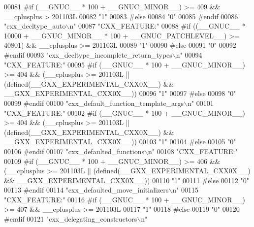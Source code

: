 \begin{DoxyCode}
00081 \textcolor{preprocessor}{#if (\_\_GNUC\_\_ * 100 + \_\_GNUC\_MINOR\_\_) >= 409 && \_\_cplusplus > 201103L}
00082 \textcolor{stringliteral}{"1"}
00083 \textcolor{preprocessor}{#else}
00084 \textcolor{stringliteral}{"0"}
00085 \textcolor{preprocessor}{#endif}
00086 \textcolor{stringliteral}{"cxx\_decltype\_auto\(\backslash\)n"}
00087 \textcolor{stringliteral}{"CXX\_FEATURE:"}
00088 \textcolor{preprocessor}{#if ((\_\_GNUC\_\_ * 10000 + \_\_GNUC\_MINOR\_\_ * 100 + \_\_GNUC\_PATCHLEVEL\_\_) >= 40801) && \_\_cplusplus >= 201103L}
00089 \textcolor{stringliteral}{"1"}
00090 \textcolor{preprocessor}{#else}
00091 \textcolor{stringliteral}{"0"}
00092 \textcolor{preprocessor}{#endif}
00093 \textcolor{stringliteral}{"cxx\_decltype\_incomplete\_return\_types\(\backslash\)n"}
00094 \textcolor{stringliteral}{"CXX\_FEATURE:"}
00095 \textcolor{preprocessor}{#if (\_\_GNUC\_\_ * 100 + \_\_GNUC\_MINOR\_\_) >= 404 && (\_\_cplusplus >= 201103L ||
       (defined(\_\_GXX\_EXPERIMENTAL\_CXX0X\_\_) && \_\_GXX\_EXPERIMENTAL\_CXX0X\_\_))}
00096 \textcolor{stringliteral}{"1"}
00097 \textcolor{preprocessor}{#else}
00098 \textcolor{stringliteral}{"0"}
00099 \textcolor{preprocessor}{#endif}
00100 \textcolor{stringliteral}{"cxx\_default\_function\_template\_args\(\backslash\)n"}
00101 \textcolor{stringliteral}{"CXX\_FEATURE:"}
00102 \textcolor{preprocessor}{#if (\_\_GNUC\_\_ * 100 + \_\_GNUC\_MINOR\_\_) >= 404 && (\_\_cplusplus >= 201103L ||
       (defined(\_\_GXX\_EXPERIMENTAL\_CXX0X\_\_) && \_\_GXX\_EXPERIMENTAL\_CXX0X\_\_))}
00103 \textcolor{stringliteral}{"1"}
00104 \textcolor{preprocessor}{#else}
00105 \textcolor{stringliteral}{"0"}
00106 \textcolor{preprocessor}{#endif}
00107 \textcolor{stringliteral}{"cxx\_defaulted\_functions\(\backslash\)n"}
00108 \textcolor{stringliteral}{"CXX\_FEATURE:"}
00109 \textcolor{preprocessor}{#if (\_\_GNUC\_\_ * 100 + \_\_GNUC\_MINOR\_\_) >= 406 && (\_\_cplusplus >= 201103L ||
       (defined(\_\_GXX\_EXPERIMENTAL\_CXX0X\_\_) && \_\_GXX\_EXPERIMENTAL\_CXX0X\_\_))}
00110 \textcolor{stringliteral}{"1"}
00111 \textcolor{preprocessor}{#else}
00112 \textcolor{stringliteral}{"0"}
00113 \textcolor{preprocessor}{#endif}
00114 \textcolor{stringliteral}{"cxx\_defaulted\_move\_initializers\(\backslash\)n"}
00115 \textcolor{stringliteral}{"CXX\_FEATURE:"}
00116 \textcolor{preprocessor}{#if (\_\_GNUC\_\_ * 100 + \_\_GNUC\_MINOR\_\_) >= 407 && \_\_cplusplus >= 201103L}
00117 \textcolor{stringliteral}{"1"}
00118 \textcolor{preprocessor}{#else}
00119 \textcolor{stringliteral}{"0"}
00120 \textcolor{preprocessor}{#endif}
00121 \textcolor{stringliteral}{"cxx\_delegating\_constructors\(\backslash\)n"}

\end{DoxyCode}
